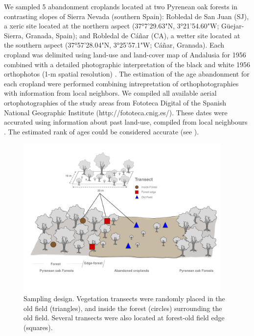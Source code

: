 We sampled 5 abandonment croplands located at two Pyrenean oak forests in contrasting slopes of Sierra Nevada (southern Spain): Robledal de San Juan (SJ), a xeric site located at the northern aspect (37°7'29.63"N, 3°21'54.60"W; Güejar-Sierra, Granada, Spain); and Robledal de Cáñar (CA), a wetter site located at the southern aspect (37°57'28.04"N, 3°25'57.1"W; Cáñar, Granada). Each cropland was delimited using land-use and land-cover map of Andalusia for 1956 \autocites[][]{CMA2007MapaUsos} combined with a detailed photographic interpretation of the black and white 1956 orthophotos (1-m spatial resolution) \autocites[see][for more details]{NavarroGonzalezetal2012CartografiaHistorica}. The estimation of the age abandonment for each cropland were performed combining intrepretation of orthophotographies with information from local neighbors. We compiled all available aerial ortophotographies of the study areas from Fototeca Digital of the Spanish National Geographic Institute (http://fototeca.cnig.es/). These dates were accurated using information about past land-use, compiled from local neighbours \autocites[by local workshops and interviews with retired elder: farmers, shepherds and loggers; see details in ][]{MorenoLlorcaetal2014CaracterizacionFuentes,MorenoLlorcaetal2016HistoricalAnalysis}. The estimated rank of ages could be considered accurate (see ).

\begin{figure}
    \centering
    \includegraphics[width=\textwidth,height=8cm,
  keepaspectratio]{img/coloniza/coloniza-transectScheme.pdf}
    \caption{Sampling design. Vegetation transects were randomly placed in the old field (triangles), and inside the forest (circles) surrounding the old field. Several transects were also located at forest-old field edge (squares).}
    \label{fig:coloniza:transects}
\end{figure}

